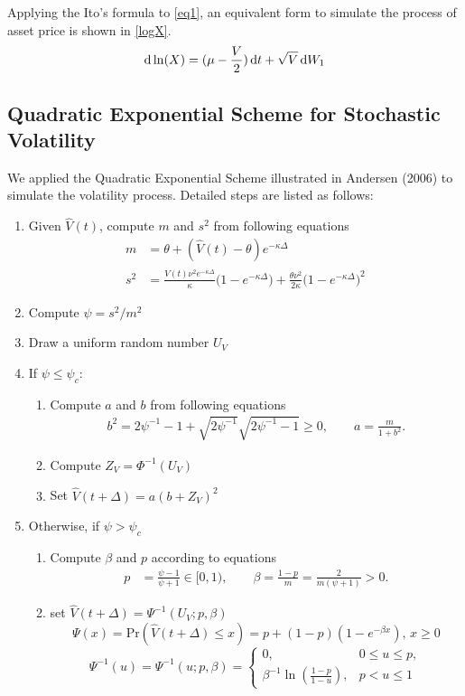 \documentclass{ws-ijfe}
\begin{document}
Applying the Ito's formula to \eqref{eq1}, an equivalent form to simulate the process of asset price is shown in \eqref{logX}.
\begin{equation}\label{logX}
  \d\ln(X)=(\mu-\frac{V}{2})\,\d t+\sqrt{V}\,\d W_1
\end{equation}

\subsection{Quadratic Exponential Scheme for Stochastic Volatility}
We applied the Quadratic Exponential Scheme illustrated in Andersen (2006) \cite{Andersen} to simulate the volatility process. Detailed steps are listed as follows:
\begin{enumerate}
\item Given $\hat{V}(t)$, compute $m$ and $s^2$ from following equations
\begin{align*}
  m &=\theta + (\hat{V}(t)-\theta)e^{-\kappa\Delta} \\
  s^2 &=\frac{\hat{V}(t)\nu^2 e^{-\kappa\Delta}}{\kappa}\bigg(1-e^{-\kappa\Delta}\bigg)+\frac{\theta\nu^2}{2\kappa}\bigg(1-e^{-\kappa\Delta}\bigg)^2
\end{align*}
\item Compute $\psi=s^2/m^2$\\
\item Draw a uniform random number $U_V$
\item If $\psi\leq\psi_c$:
\begin{enumerate}
\item Compute $a$ and $b$ from following equations
\begin{align*}
b^2=2\psi^{-1}-1+\sqrt{2\psi^{-1}}\sqrt{2\psi^{-1}-1}\geq 0, \qquad a =\frac{m}{1+b^2}.
\end{align*}
\item Compute $Z_V=\Phi^{-1}(U_V)$
\item Set $\hat{V}(t+\Delta)=a(b+Z_V)^2$
\end{enumerate}
\item Otherwise, if $\psi>\psi_c$
\begin{enumerate}
  \item Compute $\beta$ and $p$ according to equations
  \begin{align*}
    p & =\frac{\psi-1}{\psi+1}\in[0,1), \qquad%
    \beta =\frac{1-p}{m}=\frac{2}{m(\psi+1)}>0.
  \end{align*}
  \item set $\hat{V}(t+\Delta)=\Psi^{-1}(U_V;p,\beta)$
  \begin{equation*}
    \Psi(x) = \text{Pr}(\hat{V}(t+\Delta)\leq x) = p+(1-p)(1-e^{-\beta x}),\, x\geq 0
  \end{equation*}
  \[
  \Psi^{-1}(u)=\Psi^{-1}(u;p,\beta)=
  \begin{cases}
    0,\,&0\leq u \leq p,\\
    \beta^{-1}\ln(\frac{1-p}{1-u}),&p<u\leq1
  \end{cases}
  \]
\end{enumerate}
\end{enumerate}
\end{document}

